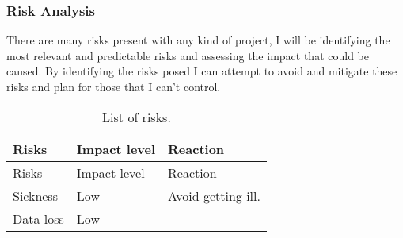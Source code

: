 \subsubsection{Risk Analysis}\label{risk-analysis}

There are many risks present with any kind of project, I will be
identifying the most relevant and predictable risks and assessing the
impact that could be caused. By identifying the risks posed I can
attempt to avoid and mitigate these risks and plan for those that I
can't control.

\begin{longtable}[]{@{}lll@{}}
\caption{List of risks.}\tabularnewline
\toprule
\begin{minipage}[b]{0.28\columnwidth}\raggedright\strut
Risks\strut
\end{minipage} & \begin{minipage}[b]{0.13\columnwidth}\raggedright\strut
Impact level\strut
\end{minipage} & \begin{minipage}[b]{0.50\columnwidth}\raggedright\strut
Reaction\strut
\end{minipage}\tabularnewline
\midrule
\endfirsthead
\toprule
\begin{minipage}[b]{0.28\columnwidth}\raggedright\strut
Risks\strut
\end{minipage} & \begin{minipage}[b]{0.13\columnwidth}\raggedright\strut
Impact level\strut
\end{minipage} & \begin{minipage}[b]{0.50\columnwidth}\raggedright\strut
Reaction\strut
\end{minipage}\tabularnewline
\midrule
\endhead
\begin{minipage}[t]{0.28\columnwidth}\raggedright\strut
Sickness\strut
\end{minipage} & \begin{minipage}[t]{0.13\columnwidth}\raggedright\strut
Low\strut
\end{minipage} & \begin{minipage}[t]{0.50\columnwidth}\raggedright\strut
Avoid getting ill.\strut
\end{minipage}\tabularnewline
\begin{minipage}[t]{0.28\columnwidth}\raggedright\strut
Data loss\strut
\end{minipage} & \begin{minipage}[t]{0.13\columnwidth}\raggedright\strut
Low\strut
\end{minipage} & \begin{minipage}[t]{0.50\columnwidth}\raggedright\strut

\end{minipage}
\end{longtable}
